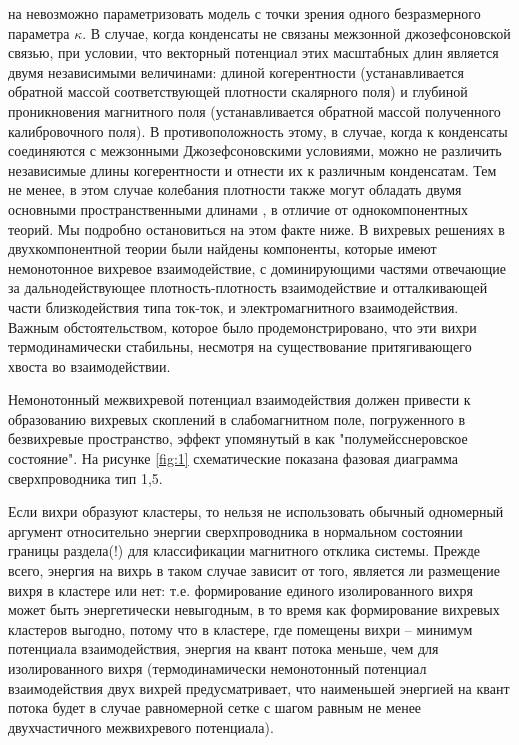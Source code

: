 на невозможно параметризовать модель с точки зрения одного безразмерного 
параметра \( \kappa \). В случае, когда конденсаты не связаны межзонной 
джозефсоновской связью, при условии, что векторный потенциал этих масштабных 
длин является двумя независимыми величинами: длиной когерентности 
(устанавливается обратной массой соответствующей плотности скалярного поля) и 
глубиной проникновения магнитного поля (устанавливается обратной массой 
полученного калибровочного поля). В противоположность этому, в случае, когда к 
конденсаты соединяются с межзонными Джозефсоновскими условиями, можно не 
различить независимые длины когерентности и отнести их к различным 
конденсатам. Тем не менее, в этом случае колебания плотности также могут 
обладать двумя основными пространственными длинами \cite{bib:2}, в отличие от 
однокомпонентных теорий. Мы подробно остановиться на этом факте ниже. В 
\cite{bib:1,bib:2} вихревых решениях в двухкомпонентной теории были найдены 
компоненты, которые имеют немонотонное вихревое взаимодействие, с 
доминирующими частями отвечающие за дальнодействующее плотность-плотность 
взаимодействие и отталкивающей части  близкодействия типа ток-ток, и 
электромагнитного взаимодействия. Важным обстоятельством, которое было 
продемонстрировано, что эти вихри термодинамически стабильны, несмотря на 
существование притягивающего хвоста во взаимодействии.

Немонотонный межвихревой потенциал взаимодействия должен привести к 
образованию вихревых скоплений в слабомагнитном поле, погруженного в 
безвихревые пространство, эффект упомянутый в \cite{bib:1} как 
"полумейсснеровское состояние". На рисунке \ref{fig:1} схематические показана 
фазовая диаграмма сверхпроводника тип 1,5.

Если вихри образуют кластеры, то нельзя не использовать обычный одномерный 
аргумент относительно энергии сверхпроводника в нормальном состоянии границы 
раздела(!) для классификации магнитного отклика системы. Прежде всего, энергия 
на вихрь в таком случае зависит от того, является ли размещение вихря в 
кластере или нет: т.е. формирование единого изолированного вихря может быть 
энергетически невыгодным, в то время как формирование вихревых кластеров 
выгодно, потому что в кластере, где помещены вихри -- минимум потенциала 
взаимодействия, энергия на квант потока меньше, чем для изолированного вихря
(термодинамически немонотонный потенциал взаимодействия двух вихрей 
предусматривает, что наименьшей энергией на квант потока будет в случае 
равномерной сетке с шагом равным не менее двухчастичного межвихревого 
потенциала).

